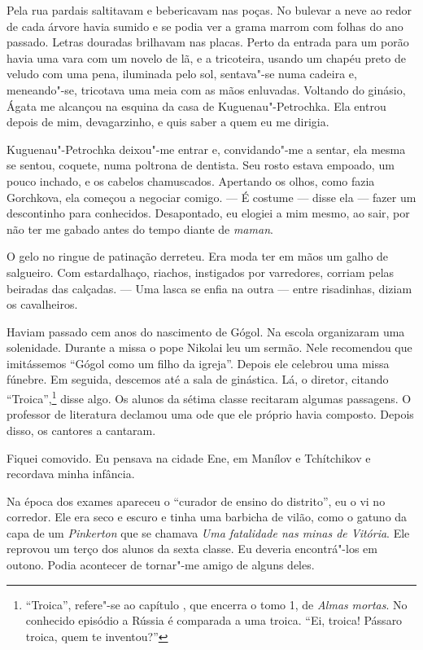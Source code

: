 Pela rua pardais saltitavam e bebericavam nas poças. No bulevar a neve
ao redor de cada árvore havia sumido e se podia ver a grama marrom com
folhas do ano passado. Letras douradas brilhavam nas placas. Perto da
entrada para um porão havia uma vara com um novelo de lã, e a
tricoteira, usando um chapéu preto de veludo com uma pena, iluminada
pelo sol, sentava"-se numa cadeira e, meneando"-se, tricotava uma meia com
as mãos enluvadas. Voltando do ginásio, Ágata me alcançou na esquina da
casa de Kuguenau"-Petrochka. Ela entrou depois de mim, devagarzinho, e
quis saber a quem eu me dirigia.

Kuguenau"-Petrochka deixou"-me entrar e, convidando"-me a sentar, ela mesma
se sentou, coquete, numa poltrona de dentista. Seu rosto estava empoado,
um pouco inchado, e os cabelos chamuscados. Apertando os olhos, como
fazia Gorchkova, ela começou a negociar comigo. --- É costume --- disse
ela --- fazer um descontinho para conhecidos. Desapontado, eu elogiei a
mim mesmo, ao sair, por não ter me gabado antes do tempo diante de
\emph{maman}.

O gelo no ringue de patinação derreteu. Era moda ter em mãos um galho de
salgueiro. Com estardalhaço, riachos, instigados por varredores, corriam
pelas beiradas das calçadas. --- Uma lasca se enfia na outra --- entre
risadinhas, diziam os cavalheiros.

Haviam passado cem anos do nascimento de Gógol. Na escola organizaram
uma solenidade. Durante a missa o pope Nikolai leu um sermão. Nele
recomendou que imitássemos ``Gógol como um filho da igreja''. Depois ele
celebrou uma missa fúnebre. Em seguida, descemos até a sala de
ginástica. Lá, o diretor, citando ``Troica'',\footnote{``Troica'',
  refere"-se ao capítulo \scalebox{.8}{XI}, que encerra o tomo 1, de \emph{Almas}
  \emph{mortas}. No conhecido episódio a Rússia é comparada a uma
  troica. ``Ei, troica! Pássaro troica, quem te inventou?''} disse algo.
Os alunos da sétima classe recitaram algumas passagens. O professor de
literatura declamou uma ode que ele próprio havia composto. Depois
disso, os cantores a cantaram.

Fiquei comovido. Eu pensava na cidade Ene, em Manílov e Tchítchikov e
recordava minha infância.

Na época dos exames apareceu o ``curador de ensino do distrito'', eu o
vi no corredor. Ele era seco e escuro e tinha uma barbicha de vilão,
como o gatuno da capa de um \emph{Pinkerton} que se chamava \emph{Uma
fatalidade nas minas de Vitória}. Ele reprovou um terço dos alunos da
sexta classe. Eu deveria encontrá"-los em outono. Podia acontecer de
tornar"-me amigo de alguns deles.

